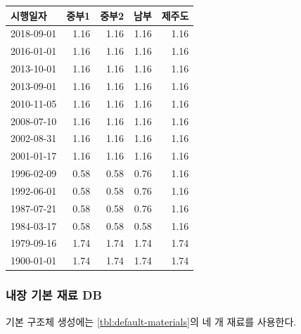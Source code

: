 \begin{defaulttable}
  \caption{\texttt{unknown} 층간바닥에 적용되는 열관류율
    $[\mathrm{W/(m^2K)}]$}
  \label{tbl:unknown-db-interfloor}
  {\small
  \renewcommand{\arraystretch}{1.05}
  \begin{tabular}{lrrrr}
    \toprule
    시행일자 & 중부1 & 중부2 & 남부 & 제주도 \\ \midrule
    2018-09-01 & 1.16 & 1.16 & 1.16 & 1.16 \\
    2016-01-01 & 1.16 & 1.16 & 1.16 & 1.16 \\
    2013-10-01 & 1.16 & 1.16 & 1.16 & 1.16 \\
    2013-09-01 & 1.16 & 1.16 & 1.16 & 1.16 \\
    2010-11-05 & 1.16 & 1.16 & 1.16 & 1.16 \\
    2008-07-10 & 1.16 & 1.16 & 1.16 & 1.16 \\
    2002-08-31 & 1.16 & 1.16 & 1.16 & 1.16 \\
    2001-01-17 & 1.16 & 1.16 & 1.16 & 1.16 \\
    1996-02-09 & 0.58 & 0.58 & 0.76 & 1.16 \\
    1992-06-01 & 0.58 & 0.58 & 0.76 & 1.16 \\
    1987-07-21 & 0.58 & 0.58 & 0.76 & 1.16 \\
    1984-03-17 & 0.58 & 0.58 & 0.58 & 1.16 \\
    1979-09-16 & 1.74 & 1.74 & 1.74 & 1.74 \\
    1900-01-01 & 1.74 & 1.74 & 1.74 & 1.74 \\
    \bottomrule
  \end{tabular}
  }
\end{defaulttable}

\subsubsection{내장 기본 재료 DB}

기본 구조체 생성에는 \cref{tbl:default-materials}의 네 개 재료를 사용한다.


